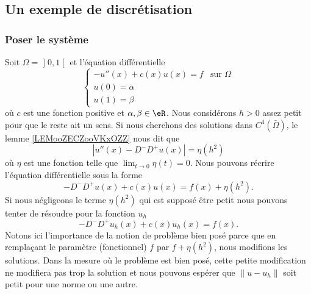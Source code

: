 \subsection{Un exemple de discrétisation}

\subsubsection{Poser le système}

Soit \( \Omega=\mathopen] 0 , 1 \mathclose[\) et l'équation différentielle
\begin{equation}        \label{EQooXJBWooRhCsLy}
     \begin{cases}
         -u''(x)+c(x)u(x)=f    &   \text{sur } \Omega\\
         u(0)=\alpha\\
         u(1)=\beta
     \end{cases}
\end{equation}
où \( c\) est une fonction positive et \( \alpha,\beta\in \eR\). Nous considérons \( h>0\) assez petit pour que le reste ait un sens. Si nous cherchons des solutions dans \( C^4(\bar\Omega)\), le lemme \ref{LEMooZECZooVKxOZZ} nous dit que 
\begin{equation}
    | u''(x)-D^-D^+u(x) |=\eta(h^2)
\end{equation}
où \( \eta\) est une fonction telle que \( \lim_{t\to 0} \eta(t)=0\). Nous pouvons récrire l'équation différentielle sous la forme
\begin{equation}
    -D^-D^+u(x)+c(x)u(x)=f(x)+\eta(h^2).
\end{equation}
Si nous négligeons le terme \( \eta(h^2)\) qui est supposé être petit nous pouvons tenter de résoudre pour la fonction \( u_h\)
\begin{equation}
    -D^-D^+u_h(x)+c(x)u_h(x)=f(x).
\end{equation}
Notons ici l'importance de la notion de problème bien posé parce que en remplaçant le paramètre (fonctionnel) \( f\) par \( f+\eta(h^2)\), nous modifions les solutions. Dans la mesure où le problème est bien posé, cette petite modification ne modifiera pas trop la solution et nous pouvons espérer que \( \| u-u_h \|\) soit petit pour une norme ou une autre.

